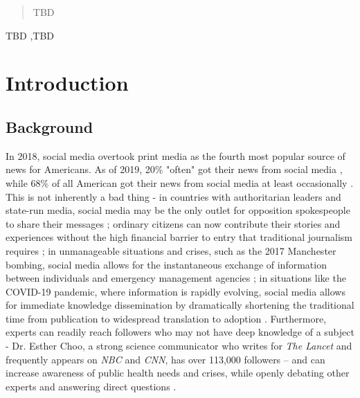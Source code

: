 \documentclass[preprint,review,12pt]{elsarticle}
\begin{document}
\begin{frontmatter}


\begin{abstract}
TBD
\end{abstract}



\begin{keyword}
TBD \sep TBD
\end{keyword}

\end{frontmatter}

\tableofcontents

\section{Introduction}
\label{introduction}
\subsection{Background}
 In 2018, social media overtook print media as the fourth most popular source of news for Americans. As of 2019, 20\% "often" got their news from social media \cite{shearer2018social}, while 68\% of all American got their news from social media at least occasionally \cite{matsa2018news}. This is not inherently a bad thing - in countries with authoritarian leaders and state-run media, social media may be the only outlet for opposition spokespeople to share their messages \cite{walker2014breaking}; ordinary citizens can now contribute their stories and experiences without the high financial barrier to entry that traditional journalism requires \cite{qualman2012socialnomics, tapscott2008wikinomics}; in unmanageable situations and crises, such as the 2017 Manchester bombing, social media allows for the instantaneous exchange of information between individuals and emergency management agencies \cite{mirbabaie2020breaking, eriksson2016facebook}; in situations like the COVID-19 pandemic, where information is rapidly evolving, social media allows for immediate knowledge dissemination by dramatically shortening the traditional time from publication to widespread translation to adoption \cite{chan2020social}. Furthermore, experts can readily reach followers who may not have deep knowledge of a subject - Dr. Esther Choo, a strong science communicator who writes for \textit{The Lancet} and frequently appears on \textit{NBC} and \textit{CNN}, has over 113,000 followers – and can increase awareness of public health needs and crises, while openly debating other experts and answering direct questions \cite{gottlieb2020information}.
\end{document}
